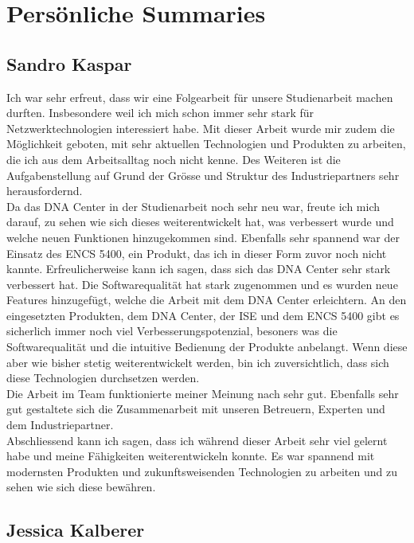 \section{Persönliche Summaries}

\subsection{Sandro Kaspar}

Ich war sehr erfreut, dass wir eine Folgearbeit für unsere Studienarbeit machen durften. Insbesondere weil ich mich schon immer sehr stark für Netzwerktechnologien interessiert habe. Mit dieser Arbeit wurde mir zudem die Möglichkeit geboten, mit sehr aktuellen Technologien und Produkten zu arbeiten, die ich aus dem Arbeitsalltag noch nicht kenne. Des Weiteren ist die Aufgabenstellung auf Grund der Grösse und Struktur des Industriepartners sehr herausfordernd.\\
Da das DNA Center in der Studienarbeit noch sehr neu war, freute ich mich darauf, zu sehen wie sich dieses weiterentwickelt hat, was verbessert wurde und welche neuen Funktionen hinzugekommen sind. Ebenfalls sehr spannend war der Einsatz des ENCS 5400, ein Produkt, das ich in dieser Form zuvor noch nicht kannte. 
Erfreulicherweise kann ich sagen, dass sich das DNA Center sehr stark verbessert hat. Die Softwarequalität hat stark zugenommen und es wurden neue Features hinzugefügt, welche die Arbeit mit dem DNA Center erleichtern. An den eingesetzten Produkten, dem DNA Center, der ISE und dem ENCS 5400 gibt es sicherlich immer noch viel Verbesserungspotenzial, besoners was die Softwarequalität und die intuitive Bedienung der Produkte anbelangt. Wenn diese aber wie bisher stetig weiterentwickelt werden, bin ich zuversichtlich, dass sich diese Technologien durchsetzen werden.\\
Die Arbeit im Team funktionierte meiner Meinung nach sehr gut. Ebenfalls sehr gut gestaltete sich die Zusammenarbeit mit unseren Betreuern, Experten und dem Industriepartner. \\
Abschliessend kann ich sagen, dass ich während dieser Arbeit sehr viel gelernt habe und meine Fähigkeiten weiterentwickeln konnte. Es war spannend mit modernsten Produkten und zukunftsweisenden Technologien zu arbeiten und zu sehen wie sich diese bewähren.

\subsection{Jessica Kalberer}
